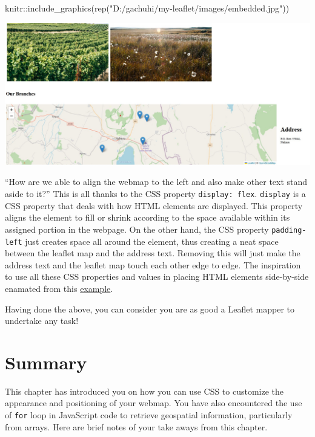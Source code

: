 \documentclass[
]{book}
\newenvironment{Shaded}{\begin{snugshade}}{\end{snugshade}}
\newcommand{\FunctionTok}[1]{\textcolor[rgb]{0.00,0.00,0.00}{#1}}
\newcommand{\NormalTok}[1]{#1}
\newcommand{\SpecialCharTok}[1]{\textcolor[rgb]{0.00,0.00,0.00}{#1}}
\newcommand{\StringTok}[1]{\textcolor[rgb]{0.31,0.60,0.02}{#1}}
\begin{document}
\begin{Shaded}
\begin{Highlighting}[]
\NormalTok{knitr}\SpecialCharTok{::}\FunctionTok{include\_graphics}\NormalTok{(}\FunctionTok{rep}\NormalTok{(}\StringTok{"D:/gachuhi/my{-}leaflet/images/embedded.jpg"}\NormalTok{))}
\end{Highlighting}
\end{Shaded}

\includegraphics[width=26.21in]{../images/embedded}

``How are we able to align the webmap to the left and also make other text stand aside to it?'' This is all thanks to the CSS property \texttt{display:\ flex}. \texttt{display} is a CSS property that deals with how HTML elements are displayed.
This property aligns the element to fill or shrink according to the space available within its assigned portion in the webpage. On the other hand, the CSS property \texttt{padding-left} just creates space all around the element, thus creating a neat space between the leaflet map and the address text. Removing this will just make the address text and the leaflet map touch each other edge to edge. The inspiration to use all these CSS properties and values in placing HTML elements side-by-side enamated from this \href{https://www.w3docs.com/snippets/css/how-to-vertically-align-text-next-to-an-image.html?utm_source=pocket_saves}{example}.

Having done the above, you can consider you are as good a Leaflet mapper to undertake any task!

\hypertarget{summary-3}{%
\section{Summary}\label{summary-3}}

This chapter has introduced you on how you can use CSS to customize the appearance and positioning of your webmap. You have also encountered the use of \texttt{for} loop in JavaScript code to retrieve geospatial information, particularly from arrays. Here are brief notes of your take aways from this chapter.
\end{document}
